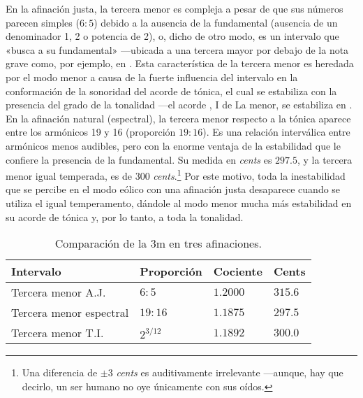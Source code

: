 \documentclass[a4paper,10pt]{article}
\begin{document}
\begin{multicols}{2}
  En la afinación justa, la tercera menor es compleja a pesar de que sus números parecen simples ($6:5$) debido a la ausencia de la fundamental (ausencia de un denominador 1, 2 o potencia de 2), o, dicho de otro modo, es un intervalo que «busca a su fundamental» ---ubicada a una tercera mayor por debajo de la nota grave como, por ejemplo,  en \hbox{.} Esta característica de la tercera menor es heredada por el modo menor a causa de la fuerte influencia del intervalo en la conformación de la sonoridad del acorde de tónica, el cual se estabiliza con la presencia del  grado de la tonalidad ---el acorde , I de La menor, se estabiliza en \hbox{.} En la afinación natural (espectral), la tercera menor respecto a la tónica aparece entre los armónicos 19 y 16 (proporción $19:16$). Es una relación interválica entre armónicos menos audibles, pero con la enorme ventaja de la estabilidad que le confiere la presencia de la fundamental. Su medida en \emph{cents} es $297.5$, y la tercera menor igual temperada, es de $300$ \emph{cents}.\footnote{Una diferencia de $\pm3$ \emph{cents} es auditivamente irrelevante ---aunque, hay que decirlo, un ser humano no oye únicamente con sus oídos.} Por este motivo, toda la inestabilidad que se percibe en el modo eólico con una afinación justa desaparece cuando se utiliza el igual temperamento, dándole al modo menor mucha más estabilidad en su acorde de tónica y, por lo tanto, a toda la tonalidad.
\end{multicols}

\begin{table}[ht]
  \centering
  \caption{Comparación de la 3m en tres afinaciones.}\label{tab:3m}
  \begin{tabular}{@{}llll@{}}
  \toprule
  Intervalo               & Proporción  & Cociente & Cents   \\ \midrule
  Tercera menor A.J.      & $6:5$       & $1.2000$ & $315.6$ \\
  Tercera menor espectral & $19:16$     & $1.1875$ & $297.5$ \\
  Tercera menor T.I.      & $2^{3/12}$  & $1.1892$ & $300.0$ \\ \bottomrule
  \end{tabular}
\end{table}
\end{document}
